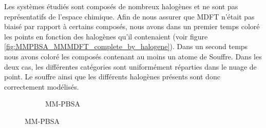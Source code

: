 Les systèmes étudiés sont composés de nombreux halogènes et ne sont pas représentatifs de l'espace chimique. Afin de nous assurer que MDFT n'était pas biaisé par rapport à certains composés, nous avons dans un premier temps coloré les points en fonction des halogènes qu'il contenaient (voir figure \ref{fig:MMPBSA_MMMDFT_complete_by_halogene}). Dans un second temps nous avons coloré les composés contenant au moins un atome de Souffre. Dans les deux cas, les différentes catégories sont uniformément réparties dans le nuage de point. Le souffre ainsi que les différents halogènes présents sont donc correctement modélisés.



\clearpage
\begin{figure}[H]
    \begin{subfigure}[b]{0.50\textwidth}
        \centering
        \caption{MM-PBSA}
\end{subfigure}
\end{figure}
